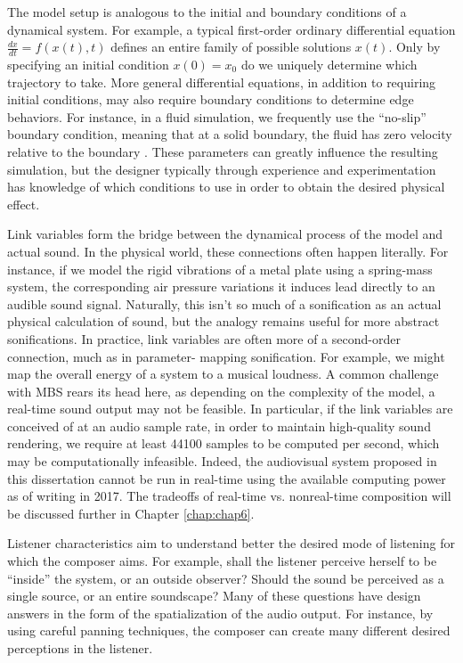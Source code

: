 The model setup is analogous to the initial and boundary conditions of a 
dynamical system. For example, a typical first-order ordinary differential 
equation $\frac{dx}{dt} = f(x(t), t)$ defines an entire family of possible 
solutions $x(t)$. Only by specifying an initial condition $x(0) = x_0$ do we 
uniquely determine which trajectory to take. More general differential 
equations, in addition to requiring initial conditions, may also require 
boundary conditions to determine edge behaviors. For instance, in a fluid 
simulation, we frequently use the ``no-slip'' boundary condition, meaning 
that at a solid boundary, the fluid has zero velocity relative to the 
boundary \cite{day1990no}. These parameters can greatly influence the resulting simulation, 
but the designer typically through experience and experimentation has 
knowledge of which conditions to use in order to obtain the desired physical 
effect.

Link variables form the bridge between the dynamical process of the model and 
actual sound. In the physical world, these connections often happen 
literally. For instance, if we model the rigid vibrations of a metal plate 
using a spring-mass system, the corresponding air pressure variations it 
induces lead directly to an audible sound signal. Naturally, this isn't so 
much of a sonification as an actual physical calculation of sound, but the 
analogy remains useful for more abstract sonifications. In practice, link 
variables are often more of a second-order connection, much as in parameter-
mapping sonification. For example, we might map the overall energy of a 
system to a musical loudness. A common challenge with MBS rears its head 
here, as depending on the complexity of the model, a real-time sound output 
may not be feasible. In particular, if the link variables are conceived of at 
an audio sample rate, in order to maintain high-quality sound rendering, we 
require at least 44100 samples to be computed per second, which may be 
computationally infeasible. Indeed, the audiovisual system proposed in this 
dissertation cannot be run in real-time using the available computing power 
as of writing in 2017. The tradeoffs of real-time vs. nonreal-time 
composition will be discussed further in Chapter \ref{chap:chap6}.

Listener characteristics aim to understand better the desired mode of 
listening for which the composer aims. For example, shall the listener 
perceive herself to be ``inside'' the system, or an outside observer? Should 
the sound be perceived as a single source, or an entire soundscape? Many of 
these questions have design answers in the form of the spatialization of the 
audio output. For instance, by using careful panning techniques, the composer 
can create many different desired perceptions in the listener.

